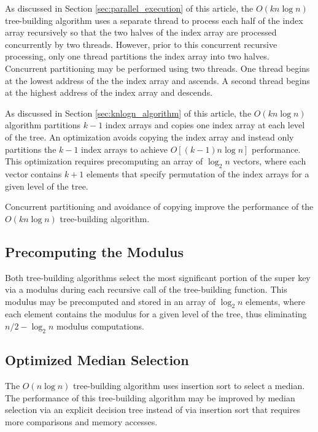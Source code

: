 \documentclass{sig-alternate}
\begin{document}
As discussed in Section \ref{sec:parallel_execution} of this article, the $O\left(kn \log n\right)$ tree-building algorithm uses a separate thread to process each half of the index array recursively so that the two halves of the index array are processed concurrently by two threads.  However, prior to this concurrent recursive processing, only one thread partitions the index array into two halves. Concurrent partitioning may be performed using two threads. One thread begins at the lowest address of the the index array and ascends. A second thread begins at the highest address of the index array and descends.

As discussed in Section \ref{sec:knlogn_algorithm} of this article, the $O\left(kn \log n\right)$ algorithm partitions $k-1$ index arrays and copies one index array at each level of the tree.  An optimization avoids copying the index array and instead only partitions the $k-1$ index arrays to achieve $O\left[\left(k - 1\right)n \log n\right]$ performance. This optimization requires precomputing an array of $\log_2 n$ vectors, where each vector contains $k+1$ elements that specify permutation of the index arrays for a given level of the tree.

 Concurrent partitioning and avoidance of copying improve the performance of the $O\left(kn \log n\right)$ tree-building algorithm.

\subsection{Precomputing the Modulus}

Both tree-building algorithms select the most significant portion of the super key via a modulus during each recursive call of the tree-building function. This modulus may be precomputed and stored in an array of $\log_2 n$ elements, where each element contains the modulus for a given level of the tree, thus eliminating $n / 2 - \log_2 n$ modulus computations.

\subsection{Optimized Median Selection}

The $O\left(n \log n\right)$ tree-building algorithm uses insertion sort \cite{Bentley2} to select a median. The performance of this tree-building algorithm may be improved by median selection via an explicit decision tree \cite{Stepanov} instead of via insertion sort that requires more comparisons and memory accesses.
\end{document}

